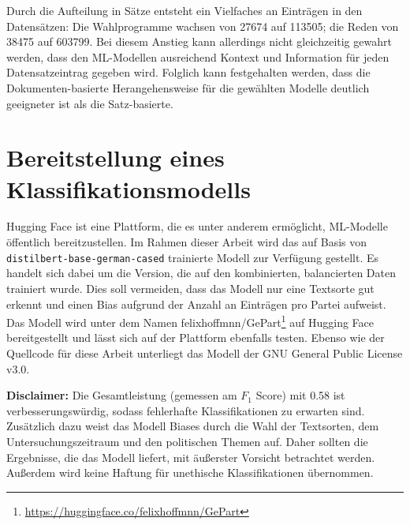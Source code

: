Durch die Aufteilung in Sätze entsteht ein Vielfaches an Einträgen in den Datensätzen: Die Wahlprogramme wachsen von \num{27674} auf \num{113505}; die Reden von \num{38475} auf \num{603799}. Bei diesem Anstieg kann allerdings nicht gleichzeitig gewahrt werden, dass den \ac{ML}-Modellen ausreichend Kontext und Information für jeden Datensatzeintrag gegeben wird. Folglich kann festgehalten werden, dass die Dokumenten-basierte Herangehensweise für die gewählten Modelle deutlich geeigneter ist als die Satz-basierte.

\section{Bereitstellung eines Klassifikationsmodells} \label{sec:crispDm_4}

Hugging Face ist eine Plattform, die es unter anderem ermöglicht, \ac{ML}-Modelle öffentlich bereitzustellen. Im Rahmen dieser Arbeit wird das auf Basis von \texttt{distilbert-base\--german-cased} trainierte Modell zur Verfügung gestellt. Es handelt sich dabei um die Version, die auf den kombinierten, balancierten Daten trainiert wurde. Dies soll vermeiden, dass das Modell nur eine Textsorte gut erkennt und einen Bias aufgrund der Anzahl an Einträgen pro Partei aufweist. Das Modell wird unter dem Namen felixhoffmnn/GePart\footnote{\href{https://huggingface.co/felixhoffmnn/GePart}{https://huggingface.co/felixhoffmnn/GePart}} auf Hugging Face bereitgestellt und lässt sich auf der Plattform ebenfalls testen. Ebenso wie der Quellcode für diese Arbeit unterliegt das Modell der GNU General Public License v3.0.

\textbf{Disclaimer:} Die Gesamtleistung (gemessen am \(F_1\) Score) mit \num{0.58} ist verbesserungswürdig, sodass fehlerhafte Klassifikationen zu erwarten sind. Zusätzlich dazu weist das Modell Biases durch die Wahl der Textsorten, dem Untersuchungszeitraum und den politischen Themen auf. Daher sollten die Ergebnisse, die das Modell liefert, mit äußerster Vorsicht betrachtet werden. Außerdem wird keine Haftung für unethische Klassifikationen übernommen.

